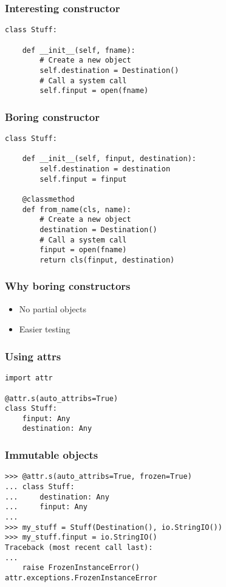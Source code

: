 \begin{frame}[fragile]
\frametitle{Interesting constructor}

\begin{lstlisting}
class Stuff:

    def __init__(self, fname):
        # Create a new object
        self.destination = Destination()
        # Call a system call
        self.finput = open(fname)
\end{lstlisting}

\end{frame}

\begin{frame}[fragile]
\frametitle{Boring constructor}

\begin{lstlisting}
class Stuff:

    def __init__(self, finput, destination):
        self.destination = destination
        self.finput = finput

    @classmethod
    def from_name(cls, name):
        # Create a new object
        destination = Destination()
        # Call a system call
        finput = open(fname)
        return cls(finput, destination)
\end{lstlisting}

\end{frame}


\begin{frame}[fragile]
\frametitle{Why boring constructors}

\begin{itemize}
\item No partial objects
\item Easier testing
\end{itemize}

\end{frame}

\begin{frame}[fragile]
\frametitle{Using attrs}

\begin{lstlisting}
import attr

@attr.s(auto_attribs=True)
class Stuff:
    finput: Any
    destination: Any
\end{lstlisting}

\end{frame}

\begin{frame}[fragile]
\frametitle{Immutable objects}

\begin{lstlisting}
>>> @attr.s(auto_attribs=True, frozen=True)
... class Stuff:
...     destination: Any
...     finput: Any
... 
>>> my_stuff = Stuff(Destination(), io.StringIO())
>>> my_stuff.finput = io.StringIO()
Traceback (most recent call last):
...
    raise FrozenInstanceError()
attr.exceptions.FrozenInstanceError
\end{lstlisting}

\end{frame}

